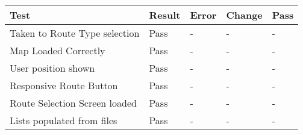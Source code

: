 \begin{table}[h]
\begin{tabular}{|l|l|l|l|l|}
\hline
\textbf{Test}                                                                                                 & \textbf{Result} & \textbf{Error}                                                                            & \textbf{Change}                                                         & \textbf{Pass} \\ \hline
Taken to Route Type selection                                                                                 & Pass            & -                                                                                         & -                                                                       & -             \\ \hline
Map Loaded Correctly                                                                                          & Pass            & -                                                                                         & -                                                                       & -             \\ \hline
User position shown                                                                                           & Pass            & -                                                                                         & -                                                                       & -             \\ \hline
Responsive Route Button                                                                                       & Pass            & -                                                                                         & -                                                                       & -             \\ \hline
Route Selection Screen loaded                                                                                 & Pass            & -                                                                                         & -                                                                       & -             \\ \hline
Lists populated from files                                                                                    & Pass            & -                                                                                         & -                                                                       & -             \\ \hline

\end{tabular}
\end{table}
